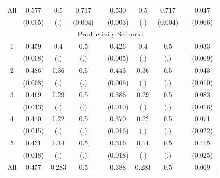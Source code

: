 \documentclass[smallcondensed]{svjour3}
\begin{document}
\begin{table}
{\begin{tabularx}{13.5cm}{cccccccccc}
   All    &  0.577         & 0.5\sym{***}   &  0.717\sym{***}   &   &  0.530         &  0.5\sym{***}   & 0.717\sym{***}  &   &  0.047\sym{***}   \\
          & (0.005)        & (.)            & (0.004)           &   & (0.003)        &  (.)            & (0.004)         &   & (0.006)           \\\hline\hline
   \multicolumn{10}{c}{Productivity Scenario}                                                                                                    \\
   1      &  0.459         & 0.4\sym{***}   &  0.5\sym{***}     &   &  0.426         &  0.4\sym{***}   & 0.5\sym{***}    &   &  0.033\sym{***}   \\
          & (0.008)        & (.)            &  (.)              &   & (0.005)        &  (.)            & (.)             &   & (0.009)           \\
   2      &  0.486         & 0.36\sym{***}  &  0.5\sym{**}      &   &  0.443         &  0.36\sym{***}  & 0.5\sym{***}    &   &  0.043\sym{***}   \\
          & (0.008)        & (.)            &  (.)              &   & (0.006)        &  (.)            & (.)             &   & (0.010)           \\
   3      &  0.469         & 0.29\sym{***}  &  0.5\sym{***}     &   &  0.386         &  0.29\sym{***}  & 0.5\sym{***}    &   &  0.083\sym{***}   \\
          & (0.013)        & (.)            &  (.)              &   & (0.010)        &  (.)            & (.)             &   & (0.016)           \\
   4      &  0.440         & 0.22\sym{***}  &  0.5\sym{***}     &   &  0.370         &  0.22\sym{***}  & 0.5\sym{***}    &   &  0.071\sym{***}   \\
          & (0.015)        & (.)            &  (.)              &   & (0.016)        &  (.)            & (.)             &   & (0.022)           \\
   5      &  0.431         & 0.14\sym{***}  &  0.5\sym{***}     &   &  0.316         &  0.14\sym{***}  & 0.5\sym{***}    &   &  0.115\sym{***}   \\
          & (0.018)        & (.)            &  (.)              &   & (0.018)        &  (.)            & (.)             &   & (0.025)           \\\hline
   All    &  0.457         & 0.283\sym{***} &  0.5\sym{***}     &   &  0.388         &  0.283\sym{***} & 0.5\sym{***}    &   &  0.069\sym{***}   \\

\end{tabularx}}
\end{table}
\end{document}

